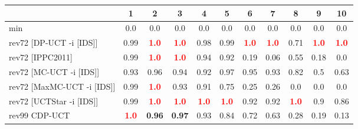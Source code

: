 \documentclass{article}
\begin{document}
\begin{tabular}{|l|r@{$\pm$}rr@{$\pm$}rr@{$\pm$}rr@{$\pm$}rr@{$\pm$}rr@{$\pm$}rr@{$\pm$}rr@{$\pm$}rr@{$\pm$}rr@{$\pm$}r|}
\hline

& \multicolumn{2}{c}{1}
& \multicolumn{2}{c}{2}
& \multicolumn{2}{c}{3}
& \multicolumn{2}{c}{4}
& \multicolumn{2}{c}{5}
& \multicolumn{2}{c}{6}
& \multicolumn{2}{c}{7}
& \multicolumn{2}{c}{8}
& \multicolumn{2}{c}{9}
& \multicolumn{2}{c|}{10}
\\
\hline
\hline
min
& \multicolumn{2}{c}{0.0}
& \multicolumn{2}{c}{0.0}
& \multicolumn{2}{c}{0.0}
& \multicolumn{2}{c}{0.0}
& \multicolumn{2}{c}{0.0}
& \multicolumn{2}{c}{0.0}
& \multicolumn{2}{c}{0.0}
& \multicolumn{2}{c}{0.0}
& \multicolumn{2}{c}{0.0}
& \multicolumn{2}{c|}{0.0}
\\
rev72 [DP-UCT -i [IDS]]
& \multicolumn{2}{c}{0.99}
& \multicolumn{2}{c}{\textbf{\textcolor{red}{1.0}}}
& \multicolumn{2}{c}{\textbf{\textcolor{red}{1.0}}}
& \multicolumn{2}{c}{0.98}
& \multicolumn{2}{c}{0.99}
& \multicolumn{2}{c}{\textbf{\textcolor{red}{1.0}}}
& \multicolumn{2}{c}{\textbf{\textcolor{red}{1.0}}}
& \multicolumn{2}{c}{0.71}
& \multicolumn{2}{c}{\textbf{\textcolor{red}{1.0}}}
& \multicolumn{2}{c|}{\textbf{\textcolor{red}{1.0}}}
\\
rev72 [IPPC2011]
& \multicolumn{2}{c}{0.99}
& \multicolumn{2}{c}{\textbf{\textcolor{red}{1.0}}}
& \multicolumn{2}{c}{\textbf{\textcolor{red}{1.0}}}
& \multicolumn{2}{c}{0.94}
& \multicolumn{2}{c}{0.92}
& \multicolumn{2}{c}{0.19}
& \multicolumn{2}{c}{0.06}
& \multicolumn{2}{c}{0.55}
& \multicolumn{2}{c}{0.18}
& \multicolumn{2}{c|}{0.0}
\\
rev72 [MC-UCT -i [IDS]]
& \multicolumn{2}{c}{0.93}
& \multicolumn{2}{c}{0.96}
& \multicolumn{2}{c}{0.94}
& \multicolumn{2}{c}{0.92}
& \multicolumn{2}{c}{0.97}
& \multicolumn{2}{c}{0.95}
& \multicolumn{2}{c}{0.93}
& \multicolumn{2}{c}{0.82}
& \multicolumn{2}{c}{0.5}
& \multicolumn{2}{c|}{0.63}
\\
rev72 [MaxMC-UCT -i [IDS]]
& \multicolumn{2}{c}{0.99}
& \multicolumn{2}{c}{\textbf{\textcolor{red}{1.0}}}
& \multicolumn{2}{c}{0.93}
& \multicolumn{2}{c}{0.91}
& \multicolumn{2}{c}{0.75}
& \multicolumn{2}{c}{0.25}
& \multicolumn{2}{c}{0.26}
& \multicolumn{2}{c}{0.0}
& \multicolumn{2}{c}{0.0}
& \multicolumn{2}{c|}{0.0}
\\
rev72 [UCTStar -i [IDS]]
& \multicolumn{2}{c}{0.99}
& \multicolumn{2}{c}{\textbf{\textcolor{red}{1.0}}}
& \multicolumn{2}{c}{\textbf{\textcolor{red}{1.0}}}
& \multicolumn{2}{c}{\textbf{\textcolor{red}{1.0}}}
& \multicolumn{2}{c}{\textbf{\textcolor{red}{1.0}}}
& \multicolumn{2}{c}{0.92}
& \multicolumn{2}{c}{0.92}
& \multicolumn{2}{c}{\textbf{\textcolor{red}{1.0}}}
& \multicolumn{2}{c}{0.9}
& \multicolumn{2}{c|}{0.86}
\\
\hline
rev99 CDP-UCT
& \multicolumn{2}{c}{\textbf{\textcolor{red}{1.0}}}
& \multicolumn{2}{c}{\textbf{0.96}}
& \multicolumn{2}{c}{\textbf{0.97}}
& \multicolumn{2}{c}{0.93}
& \multicolumn{2}{c}{0.84}
& \multicolumn{2}{c}{0.72}
& \multicolumn{2}{c}{0.63}
& \multicolumn{2}{c}{0.28}
& \multicolumn{2}{c}{0.19}
& \multicolumn{2}{c|}{0.13}
\\
\hline
\end{tabular}%
\end{document}
